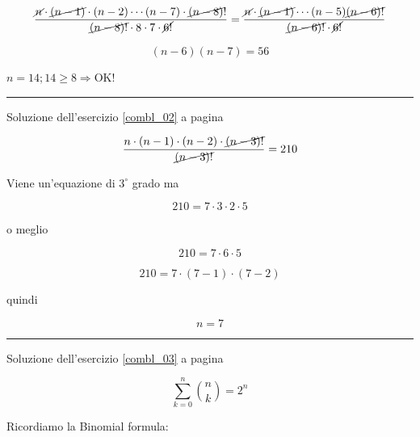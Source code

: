 \begin{equation*}
\frac{
\cancel{n} \cdot \cancel{(n-1)}\cdot(n-2) \cdots (n-7)\cdot \cancel{(n-8)}!
}
{
\cancel{(n-8)!} \cdot 8 \cdot 7 \cdot \cancel{6!}
} = \frac{
\cancel{n}\cdot\cancel{(n-1)}\cdots(n-5)\cancel{(n-6)!}
}{
\cancel{(n-6)!}\cdot\cancel{6!}
}
\end{equation*}

\begin{equation*}
(n-6)(n-7) = 56
\end{equation*}

$n=14; 14\ge 8 \Rightarrow $OK!

\vspace{1cm}
\hrule
\vspace{1cm}



Soluzione dell'esercizio \ref{combl_02} a pagina \pageref{combl_02}\label{combs_02}

\begin{equation*}
\frac{n\cdot(n-1)\cdot(n-2)\cdot
\cancel{(n-3)!}
}{
\cancel{(n-3)!}
} = 210
\end{equation*}

Viene un'equazione di $3^\circ$ grado ma

\begin{equation*}
210=7\cdot3\cdot2\cdot5
\end{equation*}

o meglio

\begin{equation*}
210=7\cdot6\cdot5
\end{equation*}

\begin{equation*}
210=7\cdot(7-1)\cdot(7-2)
\end{equation*}

quindi 

\begin{equation*}
n=7
\end{equation*}

\vspace{1cm}
\hrule
\vspace{1cm}



Soluzione dell'esercizio \ref{combl_03} a pagina \pageref{combl_03}\label{combs_03}

\begin{equation*}
\sum_{k=0}^{n}{\binom{n}{k}}=2^n
\end{equation*}

Ricordiamo la Binomial formula:

